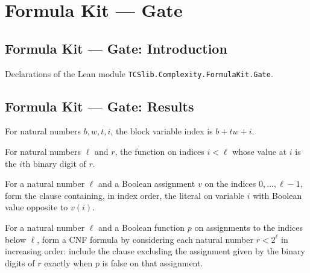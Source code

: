 \section{Formula Kit --- Gate}
\subsection*{Formula Kit --- Gate: Introduction}

Declarations of the Lean module \texttt{TCSlib.Complexity.FormulaKit.Gate}.

\subsection*{Formula Kit --- Gate: Results}

\begin{definition}
\label{Complexity.FormulaKit.blockVar}
\leanok
For natural numbers $b,w,t,i$, the block variable index is $b+tw+i$.
\end{definition}

\begin{definition}
\label{Complexity.FormulaKit.bitsOf}
\leanok
For natural numbers $\ell$ and $r$, the function on indices $i<\ell$ whose value at $i$
is the $i$th binary digit of $r$.
\end{definition}

\begin{definition}
\label{Complexity.FormulaKit.excludeClause}
\leanok
For a natural number $\ell$ and a Boolean assignment $v$ on the indices
$0,\ldots,\ell-1$, form the clause containing, in index order, the literal on variable
$i$ with Boolean value opposite to $v(i)$.
\end{definition}

\begin{definition}
\label{Complexity.FormulaKit.template}
\leanok
{}
For a natural number $\ell$ and a Boolean function $p$ on assignments to the indices
below $\ell$, form a CNF formula by considering each natural number $r<2^\ell$ in
increasing order: include the clause excluding the assignment given by the binary digits
of $r$ exactly when $p$ is false on that assignment.
\end{definition}


